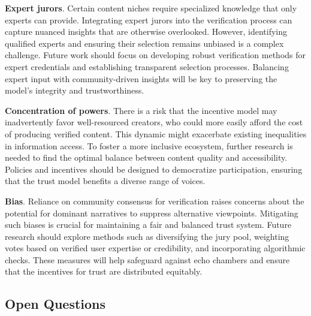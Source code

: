 \documentclass{article}
\begin{document}
\textbf{Expert jurors}. Certain content niches require specialized knowledge that only experts can provide. Integrating expert jurors into the verification process can capture nuanced insights that are otherwise overlooked. However, identifying qualified experts and ensuring their selection remains unbiased is a complex challenge. Future work should focus on developing robust verification methods for expert credentials and establishing transparent selection processes. Balancing expert input with community-driven insights will be key to preserving the model’s integrity and trustworthiness.

\textbf{Concentration of powers}. There is a risk that the incentive model may inadvertently favor well-resourced creators, who could more easily afford the cost of producing verified content. This dynamic might exacerbate existing inequalities in information access. To foster a more inclusive ecosystem, further research is needed to find the optimal balance between content quality and accessibility. Policies and incentives should be designed to democratize participation, ensuring that the trust model benefits a diverse range of voices.

\textbf{Bias}. Reliance on community consensus for verification raises concerns about the potential for dominant narratives to suppress alternative viewpoints. Mitigating such biases is crucial for maintaining a fair and balanced trust system. Future research should explore methods such as diversifying the jury pool, weighting votes based on verified user expertise or credibility, and incorporating algorithmic checks. These measures will help safeguard against echo chambers and ensure that the incentives for trust are distributed equitably.

\subsection{Open Questions}
\end{document}
